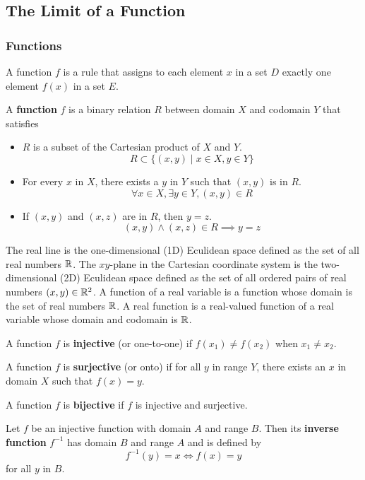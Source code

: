 \subsection{The Limit of a Function}

\subsubsection*{Functions}  
A function \(f\) is a rule that assigns to each element \(x\) in a set \(D\)
exactly one element \(f(x)\) in a set \(E\).
\begin{definition}
    A \textbf{function} \(f\) is a binary relation \(R\) between domain \(X\)
    and codomain \(Y\) that satisfies
    \begin{itemize}
        \item \(R\) is a subset of the Cartesian product of \(X\) and \(Y\).
        \[R\subset\{(x,y)\mid x\in X,y\in Y\}\]
        \item For every \(x\) in \(X\), there exists a \(y\) in \(Y\) such
        that \((x,y)\) is in \(R\).
        \[\forall x\in X,\exists y\in Y,(x,y)\in R\]
        \item If \((x,y)\) and \((x,z)\) are in \(R\), then \(y=z\).
        \[(x,y)\wedge(x,z)\in R\implies y=z\]
    \end{itemize}
\end{definition}
The real line is the one-dimensional (1D) Eculidean space defined as the set
of all real numbers \(\mathbb{R}\).
The \(xy\)-plane in the Cartesian coordinate system is the two-dimensional
(2D) Eculidean space defined as the set of all ordered pairs of real numbers
\((x,y)\in\mathbb{R}^2\).
A function of a real variable is a function whose domain is the set of real
numbers \(\mathbb{R}\).
A real function is a real-valued function of a real variable whose domain and
codomain is \(\mathbb{R}\).
\begin{definition}
    A function \(f\) is \textbf{injective} (or one-to-one) if
    \(f(x_1)\neq f(x_2)\) when \(x_1\neq x_2\).
\end{definition}
\begin{definition}
    A function \(f\) is \textbf{surjective} (or onto) if for all \(y\) in
    range \(Y\),
    there exists an \(x\) in domain \(X\) such that \(f(x)=y\).
\end{definition}
\begin{definition}
    A function \(f\) is \textbf{bijective} if \(f\) is injective and surjective.
\end{definition}
\begin{definition}
    Let \(f\) be an injective function with domain \(A\) and range \(B\).
    Then its \textbf{inverse function} \(f^{-1}\) has domain \(B\) and range
    \(A\) and is defined by
    \[f^{-1}(y)=x\iff f(x)=y\]
    for all \(y\) in \(B\).
\end{definition}

